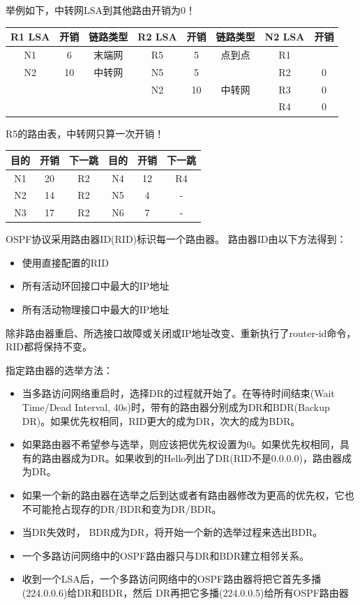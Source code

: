 \begin{analysis}
	举例如下，中转网LSA到其他路由开销为0！
	\begin{center}
	\begin{tabular}{ccc|ccc|cc}\hline
		R1 LSA & 开销 & 链路类型 & R2 LSA & 开销 & 链路类型 & N2 LSA & 开销\\\hline
		N1 & 6 & 末端网 & R5 & 5 & 点到点 & R1 & \textemph{0}\\
		N2 & 10 & 中转网 & N5 & 5 & \textemph{末端网} & R2 & 0\\
		& & & N2 & 10 & 中转网 & R3 & 0\\
		& & & & & & R4 & 0\\\hline
	\end{tabular}
	\end{center}
	R5的路由表，中转网只算一次开销！
	\begin{center}
	\begin{tabular}{ccc|ccc}\hline
		目的 & 开销 & 下一跳 & 目的 & 开销 & 下一跳\\\hline
		N1 & 20 & R2 & N4 & 12 & R4\\
		N2 & 14 & R2 & N5 & 4 & -\\
		N3 & 17 & R2 & N6 & 7 & -\\\hline
	\end{tabular}
	\end{center}
\end{analysis}

\myhline
OSPF协议采用路由器ID(RID)标识每一个路由器。
路由器ID由以下方法得到：
\begin{itemize}
	\item 使用直接配置的RID
	\item 所有活动环回接口中最大的IP地址
	\item 所有活动物理接口中最大的IP地址
\end{itemize}
除非路由器重启、所选接口故障或关闭或IP地址改变、重新执行了router-id命令，RID都将保持不变。


\myhline
指定路由器的选举方法：
\begin{itemize}
	\item 当多路访问网络重启时，选择DR的过程就开始了。在等待时间结束(Wait Time/Dead Interval, 40s)时，带有的路由器分别成为DR和BDR(Backup DR)。如果优先权相同，RID更大的成为DR，次大的成为BDR。
	\item 如果路由器不希望参与选举，则应该把优先权设置为0。如果优先权相同，具有的路由器成为DR。如果收到的Hello列出了DR(RID不是0.0.0.0)，路由器成为DR。
	\item 如果一个新的路由器在选举之后到达或者有路由器修改为更高的优先权，它也不可能抢占现存的DR/BDR和变为DR/BDR。
	\item 当DR失效时， BDR成为DR，将开始一个新的选举过程来选出BDR。
	\item 一个多路访问网络中的OSPF路由器只与DR和BDR建立相邻关系。
	\item 收到一个LSA后，一个多路访问网络中的OSPF路由器将把它首先多播(224.0.0.6)给DR和BDR，然后 DR再把它多播(224.0.0.5)给所有OSPF路由器
\end{itemize}

